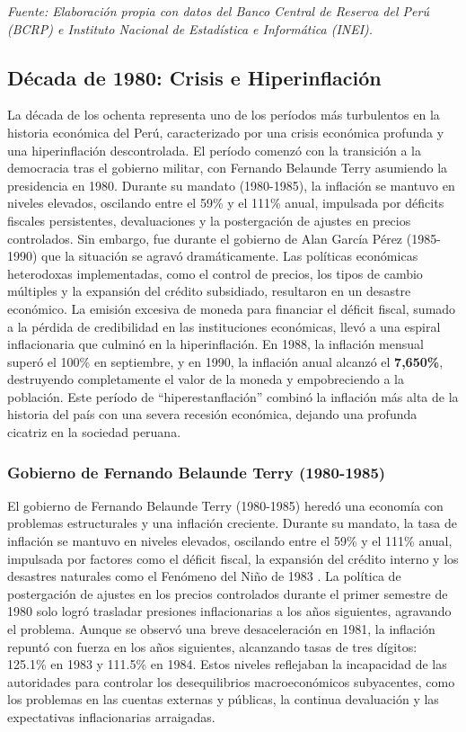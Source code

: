 \documentclass[
  stu,
  floatsintext,
  longtable,
  a4paper,
  nolmodern,
  notxfonts,
  notimes,
  12pt,
  colorlinks=true,linkcolor=blue,citecolor=blue,urlcolor=blue]{apa7}
\begin{document}
\emph{Fuente: Elaboración propia con datos del Banco Central de Reserva
del Perú (BCRP) e Instituto Nacional de Estadística e Informática
(INEI).}

\subsection{Década de 1980: Crisis e
Hiperinflación}\label{duxe9cada-de-1980-crisis-e-hiperinflaciuxf3n}

La década de los ochenta representa uno de los períodos más turbulentos
en la historia económica del Perú, caracterizado por una crisis
económica profunda y una hiperinflación descontrolada. El período
comenzó con la transición a la democracia tras el gobierno militar, con
Fernando Belaunde Terry asumiendo la presidencia en 1980. Durante su
mandato (1980-1985), la inflación se mantuvo en niveles elevados,
oscilando entre el 59\% y el 111\% anual, impulsada por déficits
fiscales persistentes, devaluaciones y la postergación de ajustes en
precios controlados. Sin embargo, fue durante el gobierno de Alan García
Pérez (1985-1990) que la situación se agravó dramáticamente. Las
políticas económicas heterodoxas implementadas, como el control de
precios, los tipos de cambio múltiples y la expansión del crédito
subsidiado, resultaron en un desastre económico. La emisión excesiva de
moneda para financiar el déficit fiscal, sumado a la pérdida de
credibilidad en las instituciones económicas, llevó a una espiral
inflacionaria que culminó en la hiperinflación. En 1988, la inflación
mensual superó el 100\% en septiembre, y en 1990, la inflación anual
alcanzó el \textbf{7,650\%}, destruyendo completamente el valor de la
moneda y empobreciendo a la población. Este período de
``hiperestanflación'' combinó la inflación más alta de la historia del
país con una severa recesión económica, dejando una profunda cicatriz en
la sociedad peruana.

\subsubsection{Gobierno de Fernando Belaunde Terry
(1980-1985)}\label{gobierno-de-fernando-belaunde-terry-1980-1985}

El gobierno de Fernando Belaunde Terry (1980-1985) heredó una economía
con problemas estructurales y una inflación creciente. Durante su
mandato, la tasa de inflación se mantuvo en niveles elevados, oscilando
entre el 59\% y el 111\% anual, impulsada por factores como el déficit
fiscal, la expansión del crédito interno y los desastres naturales como
el Fenómeno del Niño de 1983 . La política de postergación de ajustes en
los precios controlados durante el primer semestre de 1980 solo logró
trasladar presiones inflacionarias a los años siguientes, agravando el
problema. Aunque se observó una breve desaceleración en 1981, la
inflación repuntó con fuerza en los años siguientes, alcanzando tasas de
tres dígitos: 125.1\% en 1983 y 111.5\% en 1984. Estos niveles
reflejaban la incapacidad de las autoridades para controlar los
desequilibrios macroeconómicos subyacentes, como los problemas en las
cuentas externas y públicas, la continua devaluación y las expectativas
inflacionarias arraigadas.
\end{document}
